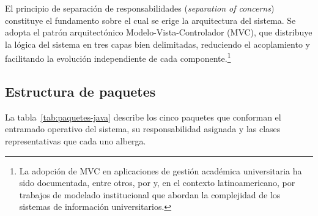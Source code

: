 \noindent
El principio de separación de responsabilidades (\textit{separation of concerns})
constituye el fundamento sobre el cual se erige la arquitectura del sistema.
Se adopta el patrón arquitectónico Modelo-Vista-Controlador (MVC), que distribuye
la lógica del sistema en tres capas bien delimitadas, reduciendo el acoplamiento y
facilitando la evolución independiente de cada componente.\footnote{La adopción de MVC
en aplicaciones de gestión académica universitaria ha sido documentada, entre otros,
por \textcite{Gamma1994} y, en el contexto latinoamericano, por trabajos de modelado
institucional que abordan la complejidad de los sistemas de información universitarios.}

\subsection{Estructura de paquetes}

La tabla~\ref{tab:paquetes-java} describe los cinco paquetes que conforman el entramado
operativo del sistema, su responsabilidad asignada y las clases representativas que
cada uno alberga.

